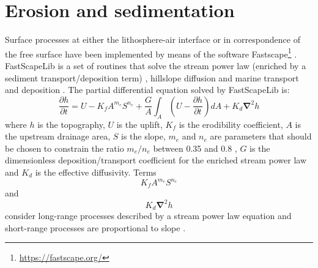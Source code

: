\documentclass[hidelinks,10pt,a4paper]{article}
\begin{document}
\section{Erosion and sedimentation}\label{sec:erosion}
Surface processes at either the lithosphere-air interface or in correspondence of the free surface have been implemented by means of the software
Fastscape\footnote{\url{https://fastscape.org/}} \citep{Braun2013,Cordonnier2019,Yuan2019a,Yuan2019b}. FastScapeLib is a set of routines that solve the stream
power law (enriched by a sediment transport/deposition term) \citep{Yuan2019a}, hillslope diffusion and marine transport and deposition \citep{Yuan2019b}.
The partial differential equation solved by FastScapeLib is:
\begin{equation}
\frac{\partial h}{ \partial t}=U-K_f A^{m_e}S^{n_e} + \frac{G}{A}\int_A \left( U-\frac{\partial h}{\partial t} \right) dA + K_d \bm{\nabla}^2 h 
\end{equation}
where $h$ is the topography, $U$ is the uplift, $K_f$ is the erodibility coefficient, $A$ is the upstream drainage area, $S$ is the slope, $m_e$ and $n_e$ are
parameters that should be chosen to constrain the ratio $m_e/n_e$ between 0.35 and 0.8 \citep{Croissant2014,Ueda2015,Beucher2020}, $G$ is the dimensionless
deposition/transport coefficient for the enriched stream power law and $K_d$ is the effective diffusivity. Terms $$K_f A^{m_e}S^{n_e}$$ and $$K_d \bm{\nabla}^2 h$$
consider long-range processes described by a stream power law equation \citep{Tucker1999,Ueda2015,Beucher2020} and short-range processes are
proportional to slope \citep{Burov1997,Ueda2015,Beucher2020}.
\end{document}

